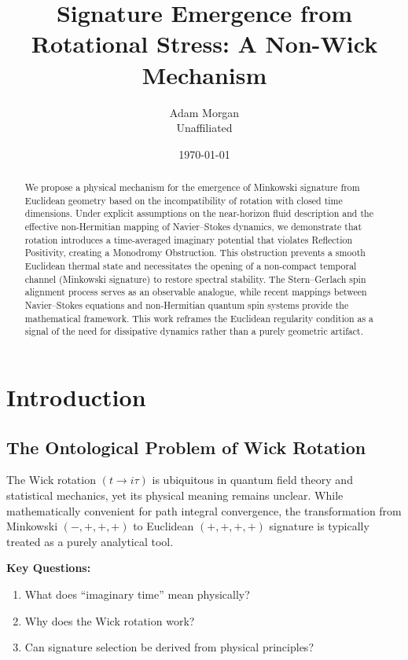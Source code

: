 \documentclass[11pt]{article}
\title{Signature Emergence from Rotational Stress: A Non-Wick Mechanism}
\author{Adam Morgan\\
\small Unaffiliated}
\date{\today}
\begin{document}
\maketitle

\begin{abstract}
We propose a physical mechanism for the emergence of Minkowski signature from Euclidean geometry based on the incompatibility of rotation with closed time dimensions. Under explicit assumptions on the near-horizon fluid description and the effective non-Hermitian mapping of Navier–Stokes dynamics, we demonstrate that rotation introduces a time-averaged imaginary potential that violates Reflection Positivity, creating a Monodromy Obstruction. This obstruction prevents a smooth Euclidean thermal state and necessitates the opening of a non-compact temporal channel (Minkowski signature) to restore spectral stability. The Stern–Gerlach spin alignment process serves as an observable analogue, while recent mappings between Navier–Stokes equations and non-Hermitian quantum spin systems provide the mathematical framework. This work reframes the Euclidean regularity condition as a signal of the need for dissipative dynamics rather than a purely geometric artifact.
\end{abstract}

\section{Introduction}

\subsection{The Ontological Problem of Wick Rotation}

The Wick rotation $(t \to i\tau)$ is ubiquitous in quantum field theory and statistical mechanics, yet its physical meaning remains unclear. While mathematically convenient for path integral convergence, the transformation from Minkowski $(-,+,+,+)$ to Euclidean $(+,+,+,+)$ signature is typically treated as a purely analytical tool.

\textbf{Key Questions:}
\begin{enumerate}
\item What does ``imaginary time'' mean physically?
\item Why does the Wick rotation work?
\item Can signature selection be derived from physical principles?
\end{enumerate}
\end{document}
